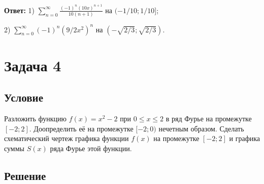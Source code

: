 \documentclass[12pt]{article}
\begin{document}
	\hspace{150pt}\textbf{Ответ:} 1) $ \sum_{n=0}^{\infty} \frac{(-1)^{n} (10x)^{n+1}}{10(n + 1)} $ на $ (-1/10;1/10] $;

	\hspace{6.6cm} 2) $ \sum_{n=0}^{\infty} (-1)^{n} (9/2x^2)^n $ на $ (-\sqrt{2/3};\sqrt{2/3}) $.

	\newpage

	\section*{Задача 4}	
	\subsection*{Условие}

	Разложить функцию $ f(x) =  x^2 - 2 $ при $ 0 \leq x \leq 2  $ в ряд Фурье на промежутке $ [-2;2] $. Доопределить её на промежутке $ [-2;0) $ нечетным образом.	Сделать схематический чертеж графика функции $ f(x) $ на промежутке $ [-2;2] $ и графика суммы $ S(x) $ ряда Фурье этой функции.

	\subsection*{Решение}
\end{document}
